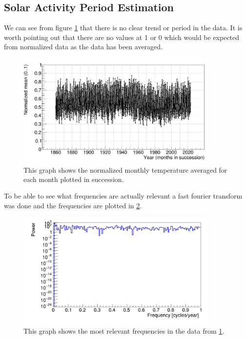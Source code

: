 \subsection{Solar Activity Period Estimation}
We can see from figure \ref{fig:monthly_temp} that there is no clear trend or period in the data. It is worth pointing out that there are no values at 1 or 0 which would be expected from normalized data as the data has been averaged.

\begin{figure}[H]
    \centering
        \centering
        \includegraphics[width=0.9\textwidth]{plots/solar/monthly_norm_temp_timeline.png}
        \caption{This graph shows the normalized monthly temperature averaged for each month plotted in succession.}
        \label{fig:monthly_temp}
\end{figure}
To be able to see what frequencies are actually relevant a fast fourier transform was done and the frequencies are plotted in \ref{fig:freq}.

\begin{figure}[H]
        \centering
        \includegraphics[width=0.9\textwidth]{plots/solar/solar_frequency_analysis.png}
        \caption{This graph shows the most relevant frequencies in the data from \ref{fig:monthly_temp}.}
        \label{fig:freq}
\end{figure}


